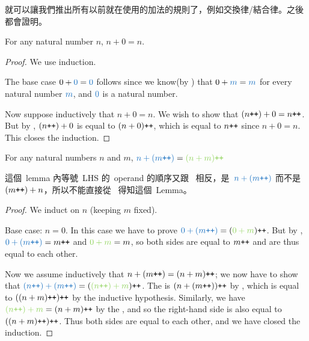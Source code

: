 \begin{note}
 就可以讓我們推出所有以前就在使用的加法的規則了，例如交換律/結合律。之後都會證明。
\end{note}

\begin{lemma}\label{lem 2.2.2}
For any natural number \(n\), \(n + 0 = n\).
\end{lemma}
\begin{proof} We use induction.

The base case \(0 + \BLUE{0} = \BLUE{0}\) follows since we know(by ) that \(0 + \BLUE{m} = \BLUE{m}\) for every natural number \(\BLUE{m}\), and \(\BLUE{0}\) is a natural number.

Now suppose inductively that \(n + 0 = n\). We wish to show that \((n\texttt{++})+0 = n\texttt{++}\). But by , \((n\texttt{++}) + 0\) is equal to \((n + 0)\texttt{++}\), which is equal to \(n\texttt{++}\) since \(n + 0 = n\). This closes the induction.
\end{proof}

\begin{lemma}\label{lem 2.2.3} For any natural numbers \(n\) and \(m\), \(\BLUE{n + (m\INC)} = \GREEN{(n + m)\INC}\)
\end{lemma}
\begin{note}
這個\ lemma 內等號\ LHS 的\ operand 的順序又跟\  相反，是\ \(\BLUE{n + (m\INC)}\) 而不是\  \((m\texttt{++}) + n\)，所以不能直接從\  得知這個\ Lemma。
\end{note}
\begin{proof}
We induct on \(n\) (keeping \(m\) fixed).

Base case: \(n = 0\). In this case we have to prove \( \BLUE{0 + (m\INC)} = (\GREEN{0 + m})\INC\). But by , \(\BLUE{0 + (m\INC)} = m\INC\) and \(\GREEN{0 + m} = m\), so both sides are equal to \(m\texttt{++}\) and are thus equal to each other.

Now we assume inductively that \(n + (m\texttt{++}) = (n + m)\texttt{++}\); we now have to show that \(\BLUE{(n\INC) + (m\INC)} = (\GREEN{(n\INC) + m})\INC\). The  is \((n + (m\texttt{++}))\texttt{++}\) by , which is equal to \(((n + m)\texttt{++})\texttt{++}\) by the inductive hypothesis. Similarly, we have \(\GREEN{(n\INC) + m} =(n + m)\INC\) by the , and so the right-hand side is also equal to \(((n + m)\texttt{++})\texttt{++}\). Thus both sides are equal to each other, and we have closed the induction.
\end{proof}

